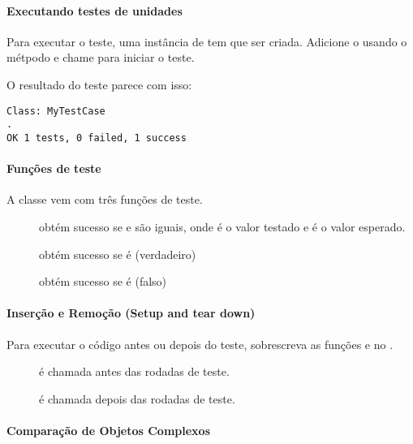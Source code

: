 {

\paragraph{Executando testes de unidades}
Para executar o teste, uma instância de  tem que ser criada. Adicione o  usando o métpodo  e chame  para iniciar o teste.


O resultado do teste parece com isso:
\begin{lstlisting} 
Class: MyTestCase
.
OK 1 tests, 0 failed, 1 success
\end{lstlisting} 

\paragraph{Funções de teste}
A classe  vem com três funções de teste.

\begin{description}
	\item[] obtém sucesso se   e  são iguais, onde  é o valor testado e  é o valor esperado.
    \item[] obtém sucesso se  é  (verdadeiro)
    \item[] obtém sucesso se  é  (falso)
\end{description}

\paragraph{Inserção e Remoção (Setup and tear down)}

Para executar o código antes ou depois do teste, sobrescreva as funções  e  no . 

\begin{description}
	\item[] é chamada antes das rodadas de teste.
	\item[] é chamada depois das rodadas de teste.
\end{description}


\paragraph{Comparação de Objetos Complexos}

}

